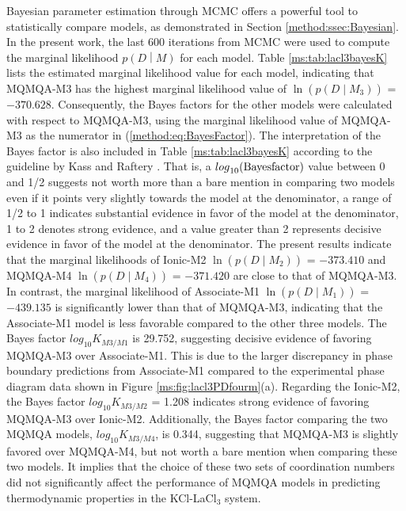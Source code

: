 Bayesian parameter estimation through MCMC offers a powerful tool to statistically compare models, as demonstrated in Section \ref{method:ssec:Bayesian}. In the present work, the last 600 iterations from MCMC were used to compute the marginal likelihood $p\left(D\middle| M\right)$ for each model. Table \ref{ms:tab:lacl3bayesK} lists the estimated marginal likelihood value for each model, indicating that MQMQA-M3 has the highest marginal likelihood value of $\ln(p\left(D\middle| M_3\right))$ = $-370.628$. Consequently, the Bayes factors for the other models were calculated with respect to MQMQA-M3, using the marginal likelihood value of MQMQA-M3 as the numerator in (\ref{method:eq:BayesFactor}). The interpretation of the Bayes factor is also included in Table \ref{ms:tab:lacl3bayesK} according to the guideline by Kass and Raftery \cite{kass1995bayes}. That is, a ${log}_{10}({\rm Bayes factor})$ value between 0 and 1/2 suggests not worth more than a bare mention in comparing two models even if it points very slightly towards the model at the denominator, a range of 1/2 to 1 indicates substantial evidence in favor of the model at the denominator, 1 to 2 denotes strong evidence, and a value greater than 2 represents decisive evidence in favor of the model at the denominator. The present results indicate that the marginal likelihoods of Ionic-M2 $\ln(p\left(D\middle| M_2\right))$ = $-373.410$ and MQMQA-M4 $\ln(p\left(D\middle| M_4\right))$ = $-371.420$ are close to that of MQMQA-M3. In contrast, the marginal likelihood of Associate-M1 $\ln(p\left(D\middle| M_1\right))$ = $-439.135$ is significantly lower than that of MQMQA-M3, indicating that the Associate-M1 model is less favorable compared to the other three models. The Bayes factor ${log}_{10}K_{M3/M1}$ is 29.752, suggesting decisive evidence of favoring MQMQA-M3 over Associate-M1. This is due to the larger discrepancy in phase boundary predictions from Associate-M1 compared to the experimental phase diagram data shown in Figure \ref{ms:fig:lacl3PDfourm}(a). Regarding the Ionic-M2, the Bayes factor ${log}_{10}K_{M3/M2}$ = 1.208 indicates strong evidence of favoring MQMQA-M3 over Ionic-M2. Additionally, the Bayes factor comparing the two MQMQA models, ${log}_{10}K_{M3/M4}$, is 0.344, suggesting that MQMQA-M3 is slightly favored over MQMQA-M4, but not worth a bare mention when comparing these two models. It implies that the choice of these two sets of coordination numbers did not significantly affect the performance of MQMQA models in predicting thermodynamic properties in the KCl-LaCl$_3$ system. 

